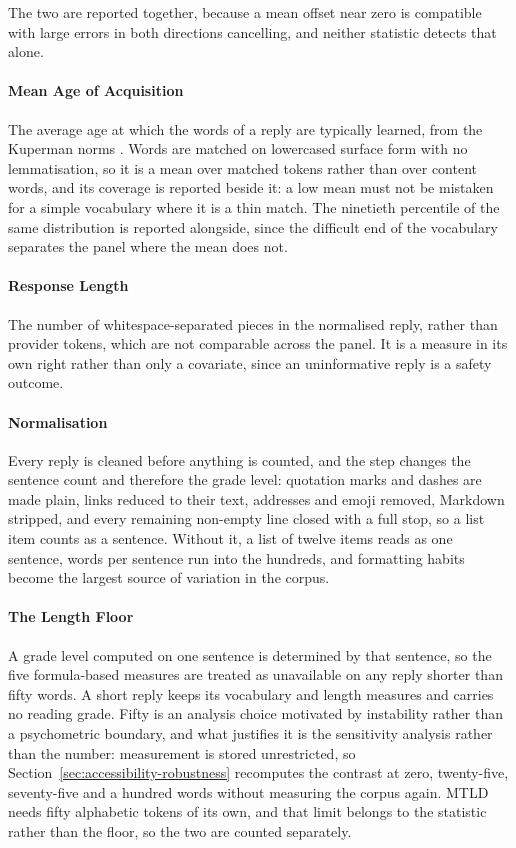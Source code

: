 The two are reported together, because a mean offset near zero is compatible with
large errors in both directions cancelling, and neither statistic detects that
alone.

\paragraph{Mean Age of Acquisition} The average age at which the words of a reply
are typically learned, from the Kuperman norms
\cite{kupermanAgeofacquisitionRatings300002012}. Words are matched on lowercased
surface form with no lemmatisation, so it is a mean over matched tokens rather
than over content words, and its coverage is reported beside it: a low mean must
not be mistaken for a simple vocabulary where it is a thin match. The ninetieth
percentile of the same distribution is reported alongside, since the difficult
end of the vocabulary separates the panel where the mean does not.

\paragraph{Response Length} The number of whitespace-separated pieces in the
normalised reply, rather than provider tokens, which are not comparable across
the panel. It is a measure in its own right rather than only a covariate, since
an uninformative reply is a safety outcome.

\paragraph{Normalisation} Every reply is cleaned before anything is counted, and
the step changes the sentence count and therefore the grade level: quotation
marks and dashes are made plain, links reduced to their text, addresses and emoji
removed, Markdown stripped, and every remaining non-empty line closed with a full
stop, so a list item counts as a sentence. Without it, a list of twelve items
reads as one sentence, words per sentence run into the hundreds, and formatting
habits become the largest source of variation in the corpus.

\paragraph{The Length Floor} A grade level computed on one sentence is determined
by that sentence, so the five formula-based measures are treated as unavailable
on any reply shorter than fifty words. A short reply keeps its vocabulary and
length measures and carries no reading grade. Fifty is an analysis choice
motivated by instability rather than a psychometric boundary, and what justifies
it is the sensitivity analysis rather than the number: measurement is stored
unrestricted, so Section~\ref{sec:accessibility-robustness} recomputes the
contrast at zero, twenty-five, seventy-five and a hundred words without measuring
the corpus again. MTLD needs fifty alphabetic tokens of its own, and that limit
belongs to the statistic rather than the floor, so the two are counted separately.


